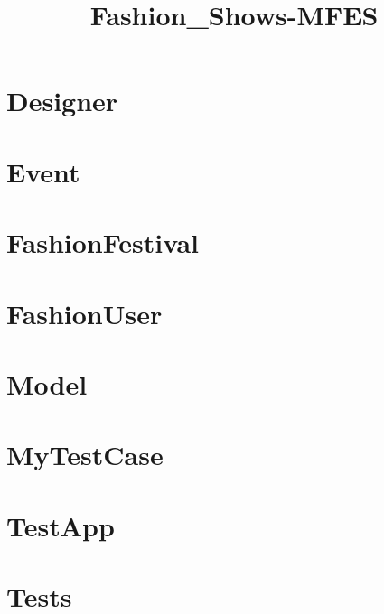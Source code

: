 \documentclass{article}
\begin{document}
\title{Fashion\_Shows-MFES}
\author{}
\maketitle
\tableofcontents

\section{Designer}

\section{Event}

\section{FashionFestival}

\section{FashionUser}

\section{Model}

\section{MyTestCase}

\section{TestApp}

\section{Tests}

\end{document}
